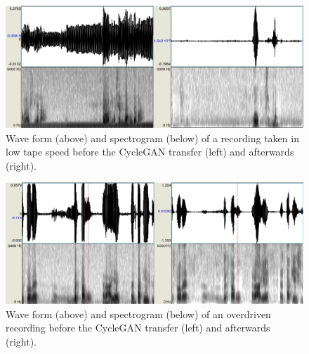 \documentclass[runningheads,a4paper]{llncs}
\begin{document}
\begin{figure}[htpb]
\includegraphics[scale=0.4]{rc/plzen.eps}
\caption{Wave form (above) and spectrogram (below) of a recording taken in low
tape speed before the CycleGAN transfer (left) and afterwards (right).}
\label{fig:plzen}
\end{figure}

\begin{figure}[htpb]
\includegraphics[scale=0.4]{rc/overdrive.eps}
\caption{Wave form (above) and spectrogram (below) of an overdriven recording
before the CycleGAN transfer (left) and afterwards (right).}
\label{fig:overdrive}
\end{figure}
\end{document}
